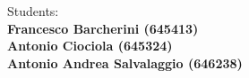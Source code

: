 \begin{titlepage}
\begin{minipage}[t]{0.47\textwidth}
\end{minipage}
\hfill
\begin{minipage}[t]{0.51\textwidth}\raggedleft
	{\large{Students:}
            {\normalsize\vspace{3mm} \bf\\ \large{Francesco Barcherini (645413)}}
            {\normalsize\vspace{3mm} \bf\\ \large{Antonio Ciociola (645324)}}
            {\normalsize\vspace{3mm} \bf\\ \large{Antonio Andrea Salvalaggio (646238)}}
        }
            
\end{minipage}

\vspace{30mm}
\hrulefill
\\

\end{titlepage}











